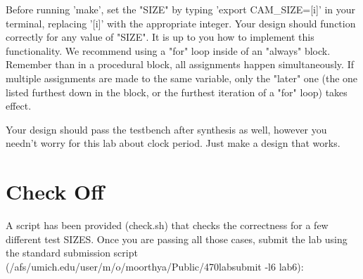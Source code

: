 \documentclass{article}
\begin{document}
Before running 'make', set the "SIZE" by typing 'export CAM\_SIZE=[i]' in your terminal, replacing '[i]' with the appropriate integer. Your design should function correctly for any value of "SIZE". It is up to you how to implement this functionality. We recommend using a "for" loop inside of an "always" block. Remember than in a procedural block, all assignments happen simultaneously. If multiple assignments are made to the same variable, only the "later" one (the one listed furthest down in the block, or the furthest iteration of a "for" loop) takes effect.


Your design should pass the testbench after synthesis as well, however you needn't worry for this lab about clock period. Just make a design that works.

\section{Check Off}
A script has been provided (check.sh) that checks the correctness for a few different test SIZES. Once you are passing all those cases, submit the lab using the standard submission script (/afs/umich.edu/user/m/o/moorthya/Public/470labsubmit -l6 lab6):
\end{document}
